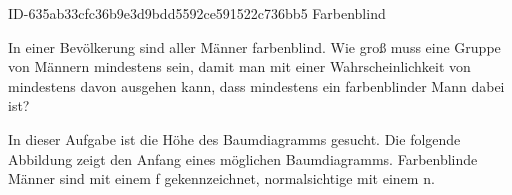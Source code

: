 \begin{exercise}
      {ID-635ab33cfc36b9e3d9bdd5592ce591522c736bb5}
      {Farbenblind}
  \ifproblem\problem\par
    In einer Bevölkerung sind  aller Männer farbenblind. Wie groß muss
    eine Gruppe von Männern mindestens sein, damit man mit einer Wahrscheinlichkeit von
    mindestens  davon ausgehen kann, dass mindestens ein farbenblinder Mann dabei ist?
  \fi
  \ifoutcome\outcome\par
    In dieser Aufgabe ist die Höhe des Baumdiagramms gesucht.
    Die folgende Abbildung zeigt den Anfang eines möglichen
    Baumdiagramms. Farbenblinde Männer sind mit einem
    \glqq f\grqq{} gekennzeichnet, normalsichtige mit
    einem \glqq n\grqq.
    \begin{center}
\end{center}
\end{exercise}
